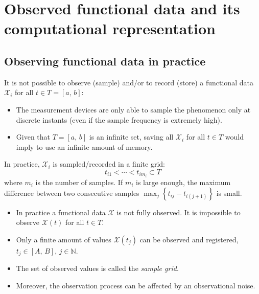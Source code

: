 \chapter{Observed functional data and its computational representation}

\section{Observing functional data in practice}%

It is not possible to observe (sample) and/or to record (store)
a functional data $\mathcal X_i$ for all $t\in T=[a,\,b]$:
\begin{itemize}
	\item The measurement devices are only able to sample the phenomenon
	      only at discrete instants (even if the sample frequency is extremely high).
	\item Given that $T = [a,\,b]$ is an infinite set, saving all
	      $\mathcal X_i$ for all $t\in T$ would imply to use an infinite amount of memory.
\end{itemize}

In practice, $\mathcal X_i$ is sampled/recorded in a finite grid:
\begin{equation*}
	t_{i1} < \cdots < t_{im_i} \subset T
\end{equation*}
where $m_i$ is the number of samples. If $m_i$ is large enough,
the maximum difference between two consecutive samples
$\max_j\left\{t_{ij} - t_{i(j+1)}\right\}$ is small.

\begin{recap}{}{}
    \begin{itemize}
        \item In practice a functional data $\mathcal X$ is not fully observed.
            It is impossible to observe $\mathcal X(t)$ for all $t\in T$.
        \item Only a finite amount of values $\mathcal X(t_j)$ can be observed
            and registered, $t_j \in [A,\,B],\,j\in\mathds N$.

        \item The set of observed values is called the \emph{sample grid}.
        \item Moreover, the observation process can be affected by an observational noise.
    \end{itemize}
\end{recap}


